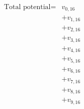 \documentclass[preview]{standalone}
\begin{document}
\begin{align*}
\text{Total potential} = &v_{0,16} \\ &+ v_{1,16} \\ &+ v_{2,16} \\ &+ v_{3,16} \\ &+ v_{4,16} \\ &+ v_{5,16} \\ &+ v_{6,16} \\ &+ v_{7,16} \\ &+ v_{8,16} \\ &+ v_{9,16}
\end{align*}
\end{document}
